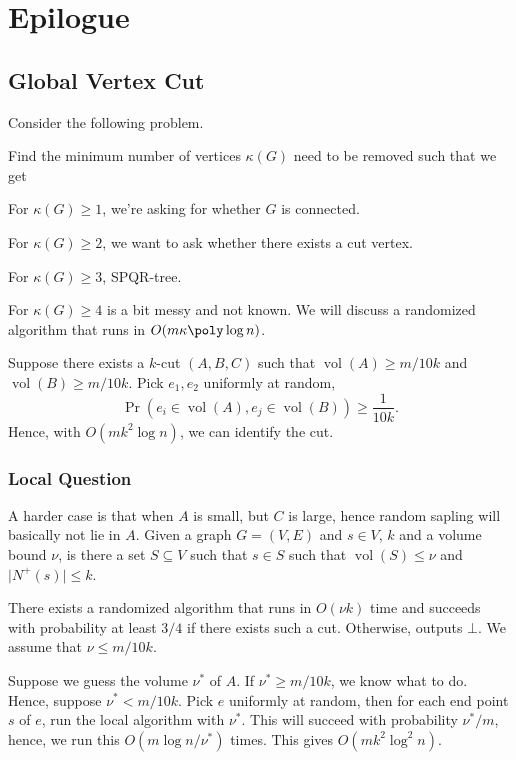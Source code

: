 \chapter{Epilogue}
\section{Global Vertex Cut}
Consider the following problem.

\begin{problem}
Find the minimum number of vertices \(\kappa (G)\) need to be removed such that we get
\end{problem}

For \(\kappa (G) \geq 1\), we're asking for whether \(G\) is connected.

For \(\kappa (G) \geq 2\), we want to ask whether there exists a cut vertex.

For \(\kappa (G) \geq 3\), SPQR-tree.

For \(\kappa (G) \geq 4\) is a bit messy and not known. We will discuss a randomized algorithm that runs in \(O(m \kappa \poly \log n)\).

Suppose there exists a \(k\)-cut \((A, B, C)\) such that \(\operatorname{vol}(A) \geq m / 10k\) and \(\operatorname{vol}(B) \geq m / 10k\). Pick \(e_1, e_2\) uniformly at random,
\[
	\Pr_{}(e_i \in \operatorname{vol}(A), e_j \in \operatorname{vol}(B) )
	\geq \frac{1}{10k}.
\]
Hence, with \(O(mk^2 \log n)\), we can identify the cut.

\subsection{Local Question}
A harder case is that when \(A\) is small, but \(C\) is large, hence random sapling will basically not lie in \(A\). Given a graph \(G = (V, E)\) and \(s \in V\), \(k\) and a volume bound \(\nu \), is there a set \(S \subseteq V\) such that \(s \in S\) such that \(\operatorname{vol}(S) \leq \nu \) and \(\lvert N^+(s) \rvert \leq k\).

\begin{theorem}
	There exists a randomized algorithm that runs in \(O(\nu k)\) time and succeeds with probability at least \(3 / 4\) if there exists such a cut. Otherwise, outputs \(\bot\). We assume that \(\nu \leq m / 10k\).
\end{theorem}

Suppose we guess the volume \(\nu ^{\ast} \) of \(A\). If \(\nu ^{\ast} \geq m / 10k\), we know what to do. Hence, suppose \(\nu ^{\ast} < m / 10k\). Pick \(e\) uniformly at random, then for each end point \(s\) of \(e\), run the local algorithm with \(\nu ^{\ast} \). This will succeed with probability \(\nu ^{\ast} / m\), hence, we run this \(O(m \log n / \nu ^{\ast} )\) times. This gives \(O(mk^2 \log ^2 n)\).

